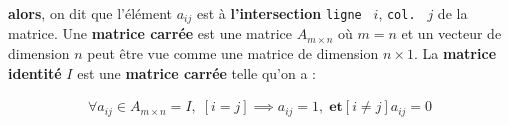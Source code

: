 \documentclass{report}
\begin{document}
\begin{multicols*}{2}
    \textbf{alors},  on dit que l'élément $a_{ij}$ est à
    \textbf{l'intersection} \texttt{ligne } $i$, \texttt{col. } $j$      
    de la matrice.  Une \textbf{matrice carrée} est une 
    matrice $A_{m \times n}$ où $m = n$ et un vecteur de dimension $n$ 
    peut être vue comme une matrice de dimension $n \times 1$. 
    La \textbf{matrice identité} $I$ est 
    une \textbf{matrice carrée} telle qu'on a : 

    \begin{align*}
        \boxed{\forall a_{ij} \in A_{m \times n} = I, \; 
        \left[  i = j \right] \implies a_{ij} = 1,  \; \textbf{et}  
        \left[ i \neq j \right] a_{ij} = 0 
    }
    \end{align*}


    
    \end{multicols*} 




        

        
            
\end{document}
